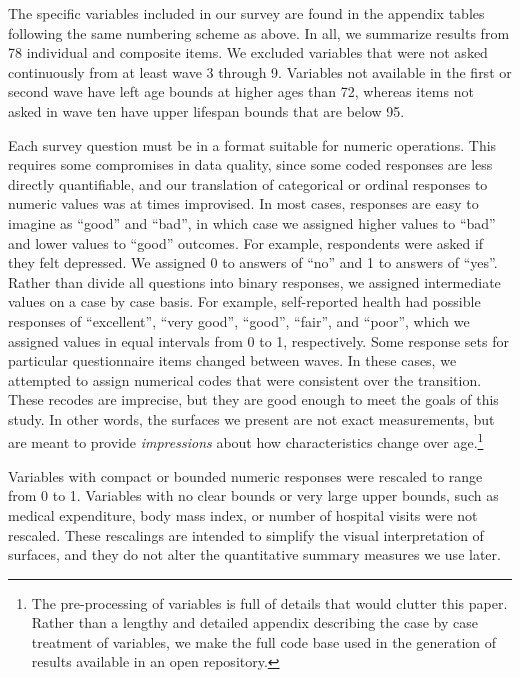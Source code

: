 \documentclass[11pt,oneside]{article} %
\begin{document}
The specific variables included in our survey are found in the appendix
tables following the same numbering scheme as above. In all, we summarize
results from 78 individual and composite items.
We excluded variables that were not asked continuously from at least wave 3 through 9. Variables not available in the
first or second wave have left age bounds at higher ages than 72, whereas items
not asked in wave ten have upper lifespan bounds that are below 95.

Each survey question must be in a format suitable for numeric operations.
This requires some compromises in data quality, since some coded responses are less directly
quantifiable, and our translation of categorical or ordinal responses to numeric
values was at times improvised. In most cases, responses are easy to imagine as
``good'' and ``bad'', in which case we assigned higher values to ``bad'' and
lower values to ``good'' outcomes. For example, respondents were asked if they
felt depressed. We assigned 0 to answers of ``no'' and 1 to answers of ``yes''.
Rather than divide all questions into binary responses, we assigned intermediate
values on a case by case basis. For example, self-reported health
had possible responses of ``excellent'', ``very good'', ``good'',
``fair'', and ``poor'', which we assigned values in equal intervals
from 0 to 1, respectively. Some response
sets for particular questionnaire items changed between
waves.
In these cases, we attempted to assign numerical codes that were consistent
over the transition. These recodes are imprecise, but they are good enough
to meet the goals of this study. In other words, the surfaces we
present are not exact measurements, but are meant to provide
\textit{impressions} about how characteristics change over age.\footnote{The
pre-processing of variables is full of details that would clutter this paper.
Rather than a lengthy and detailed appendix describing the case by case
treatment of variables, we make the full code base used in the generation of
results available in an open repository.}

Variables with compact or bounded numeric responses were rescaled to range from
0 to 1. Variables with no clear bounds or very large upper
bounds, such as medical expenditure, body mass index, or number of hospital
visits were not rescaled. These rescalings are intended to simplify
the visual interpretation of surfaces, and they do not alter the
quantitative summary measures we use later. 
\end{document}
